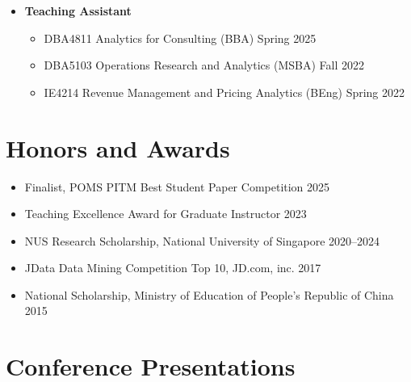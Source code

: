 \documentclass[12pt, a4paper]{article}
\begin{document}
{\begin{itemize}
	\item[] \textbf{Teaching Assistant}
	\begin{itemize}
		\item DBA4811 Analytics for Consulting (BBA) \hfill Spring 2025
		\item DBA5103 Operations Research and Analytics (MSBA) \hfill Fall 2022
		\item IE4214 Revenue Management and Pricing Analytics (BEng) \hfill Spring 2022
	\end{itemize}
\end{itemize}




\section*{Honors and Awards}

\begin{itemize}[leftmargin=30pt]
	\item Finalist, POMS PITM Best Student Paper Competition \hfill 2025
	\item Teaching Excellence Award for Graduate Instructor \hfill 2023
	\item NUS Research Scholarship, National University of Singapore \hfill 2020--2024
	\item JData Data Mining Competition Top 10, JD.com, inc. \hfill 2017
	\item National Scholarship, Ministry of Education of People's Republic of China \hfill 2015
\end{itemize}




\section*{Conference Presentations}

\begin{itemize}


\end{itemize}}
\end{document}
